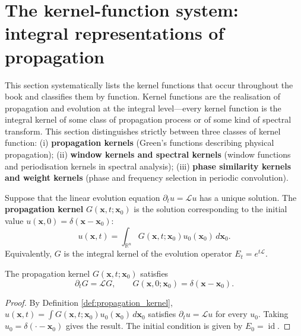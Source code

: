 \section{The kernel-function system: integral representations of propagation}\label{sec:kernel_functions}

\begin{remark}\label{rem:kernel_section_positioning}
This section systematically lists the kernel functions that occur throughout the book and classifies them by function. Kernel functions are the realisation of propagation and evolution at the integral level---every kernel function is the integral kernel of some class of propagation process or of some kind of spectral transform. This section distinguishes strictly between three classes of kernel function: (i) \textbf{propagation kernels} (Green's functions describing physical propagation); (ii) \textbf{window kernels and spectral kernels} (window functions and periodisation kernels in spectral analysis); (iii) \textbf{phase similarity kernels and weight kernels} (phase and frequency selection in periodic convolution).
\end{remark}

\begin{definition}\label{def:propagation_kernel}
Suppose that the linear evolution equation $\partial_t u = \mathcal{L}u$ has a unique solution. The \textbf{propagation kernel} $G(\mathbf{x},t;\mathbf{x}_0)$ is the solution corresponding to the initial value $u(\mathbf{x},0) = \delta(\mathbf{x}-\mathbf{x}_0)$:
\[
u(\mathbf{x},t) = \int_{\mathbb{R}^n}G(\mathbf{x},t;\mathbf{x}_0)u_0(\mathbf{x}_0)\,d\mathbf{x}_0.
\]
Equivalently, $G$ is the integral kernel of the evolution operator $E_t = e^{t\mathcal{L}}$.
\end{definition}

\begin{theorem}\label{thm:propagation_kernel_satisfies_pde}
The propagation kernel $G(\mathbf{x},t;\mathbf{x}_0)$ satisfies
\[
\partial_t G = \mathcal{L}G, \qquad G(\mathbf{x},0;\mathbf{x}_0) = \delta(\mathbf{x}-\mathbf{x}_0).
\]
\end{theorem}

\begin{proof}
By Definition \ref{def:propagation_kernel}, $u(\mathbf{x},t) = \int G(\mathbf{x},t;\mathbf{x}_0)u_0(\mathbf{x}_0)\,d\mathbf{x}_0$ satisfies $\partial_t u = \mathcal{L}u$ for every $u_0$. Taking $u_0 = \delta(\cdot-\mathbf{x}_0)$ gives the result. The initial condition is given by $E_0 = \operatorname{id}$.
\end{proof}

